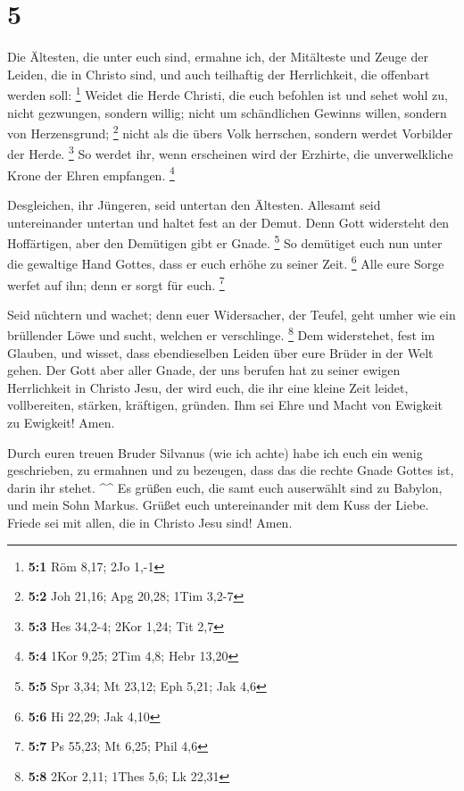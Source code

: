 \hypertarget{section-3}{%
\section{5}\label{section-3}}

 Die Ältesten, die unter euch sind, ermahne ich, der
Mitälteste und Zeuge der Leiden, die in Christo sind, und auch
teilhaftig der Herrlichkeit, die offenbart werden soll: \footnote{\textbf{5:1}
  Röm 8,17; 2Jo 1,-1}  Weidet die Herde Christi, die euch
befohlen ist und sehet wohl zu, nicht gezwungen, sondern willig; nicht
um schändlichen Gewinns willen, sondern von Herzensgrund; \footnote{\textbf{5:2}
  Joh 21,16; Apg 20,28; 1Tim 3,2-7}  nicht als die übers
Volk herrschen, sondern werdet Vorbilder der Herde. \footnote{\textbf{5:3}
  Hes 34,2-4; 2Kor 1,24; Tit 2,7}  So werdet ihr, wenn
erscheinen wird der Erzhirte, die unverwelkliche Krone der Ehren
empfangen. \footnote{\textbf{5:4} 1Kor 9,25; 2Tim 4,8; Hebr 13,20}

 Desgleichen, ihr Jüngeren, seid untertan den Ältesten.
Allesamt seid untereinander untertan und haltet fest an der Demut. Denn
Gott widersteht den Hoffärtigen, aber den Demütigen gibt er Gnade.
\footnote{\textbf{5:5} Spr 3,34; Mt 23,12; Eph 5,21; Jak 4,6}
 So demütiget euch nun unter die gewaltige Hand Gottes, dass
er euch erhöhe zu seiner Zeit. \footnote{\textbf{5:6} Hi 22,29; Jak 4,10}
 Alle eure Sorge werfet auf ihn; denn er sorgt für euch.
\footnote{\textbf{5:7} Ps 55,23; Mt 6,25; Phil 4,6}

 Seid nüchtern und wachet; denn euer Widersacher, der
Teufel, geht umher wie ein brüllender Löwe und sucht, welchen er
verschlinge. \footnote{\textbf{5:8} 2Kor 2,11; 1Thes 5,6; Lk 22,31}
 Dem widerstehet, fest im Glauben, und wisset, dass
ebendieselben Leiden über eure Brüder in der Welt gehen. 
Der Gott aber aller Gnade, der uns berufen hat zu seiner ewigen
Herrlichkeit in Christo Jesu, der wird euch, die ihr eine kleine Zeit
leidet, vollbereiten, stärken, kräftigen, gründen.  Ihm sei
Ehre und Macht von Ewigkeit zu Ewigkeit! Amen.

 Durch euren treuen Bruder Silvanus (wie ich achte) habe
ich euch ein wenig geschrieben, zu ermahnen und zu bezeugen, dass das
die rechte Gnade Gottes ist, darin ihr stehet. \^{}\^{}  Es
grüßen euch, die samt euch auserwählt sind zu Babylon, und mein Sohn
Markus.  Grüßet euch untereinander mit dem Kuss der Liebe.
Friede sei mit allen, die in Christo Jesu sind! Amen.
